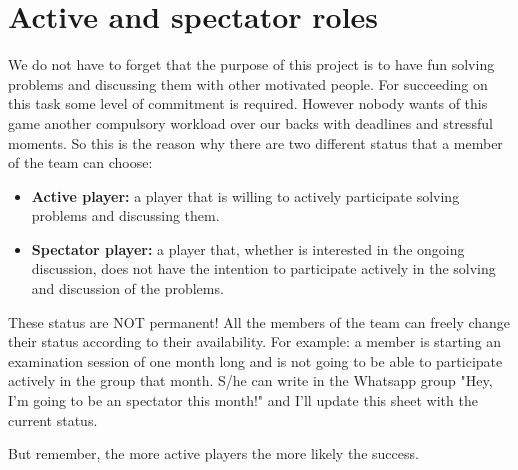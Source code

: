 \documentclass[english,11pt]{article}
\theoremstyle{definition}
\theoremstyle{plain}
\begin{document}
\section*{Active and spectator roles}
\par We do not have to forget that the purpose of this project is to have fun solving problems and discussing them with other motivated people. For succeeding on this task some level of commitment is required. However nobody wants of this game another compulsory workload over our backs with deadlines and stressful moments. So this is the reason why there are two different status that a member of the team can choose: 
\begin{itemize}
\item \textbf{Active player:} a player that is willing to actively participate solving problems and discussing them. 
\item  \textbf{Spectator player:} a player that, whether is interested in the ongoing discussion, does not have the intention to participate actively in the solving and discussion of the problems.
\end{itemize}
\par These status are NOT permanent! All the members of the team can freely change their status according to their availability. For example: a member is starting an examination session of one month long and is not going to be able to participate actively in the group that month. S/he can write in the Whatsapp group "Hey, I'm going to be an spectator this month!" and I'll update this sheet with the current status.
\par But remember, the more active players the more likely the success.
\end{document}
